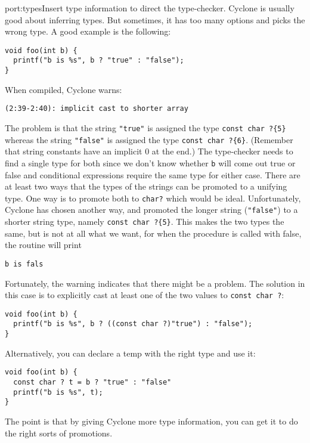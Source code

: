 \begin{porta}{port:types}{Insert type information to direct the type-checker.}
Cyclone is usually good about inferring types.  But sometimes, it
has too many options and picks the wrong type.  A good example is
the following:
\begin{verbatim}
void foo(int b) {
  printf("b is %s", b ? "true" : "false");
} 
\end{verbatim}

When compiled, Cyclone warns:
\begin{verbatim}
(2:39-2:40): implicit cast to shorter array
\end{verbatim}

The problem is that the string \texttt{"true"} is assigned the
type \texttt{const char ?\{5\}} whereas the string
\texttt{"false"} is assigned the type \texttt{const char ?\{6\}}.
(Remember that string constants have an implicit 0 at the end.)
The type-checker needs to find a single type for both since
we don't know whether \texttt{b} will come out true or false
and conditional expressions require the same type for either
case.  There are at least two ways that the types of the strings can be
promoted to a unifying type.  One way is to promote both
to \texttt{char?} which would be ideal.  Unfortunately, Cyclone
has chosen another way, and promoted the longer string
(\texttt{"false"}) to a shorter string type, namely
\texttt{const char ?\{5\}}.  This makes the two types the
same, but is not at all what we want, for when the procedure
is called with false, the routine will print
\begin{verbatim}
b is fals
\end{verbatim}

Fortunately, the warning indicates that there might be a problem.
The solution in this case is to explicitly cast at least one of the two
values to \texttt{const char ?}:
\begin{verbatim}
void foo(int b) {
  printf("b is %s", b ? ((const char ?)"true") : "false");
} 
\end{verbatim}

Alternatively, you can declare a temp with the right type and use
it:
\begin{verbatim}
void foo(int b) {
  const char ? t = b ? "true" : "false"
  printf("b is %s", t);
} 
\end{verbatim}

The point is that by giving Cyclone more type information, you can
get it to do the right sorts of promotions.  
\end{porta}

